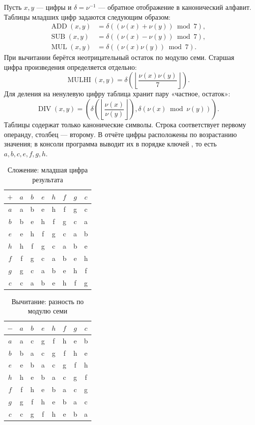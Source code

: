 \documentclass[14pt,a4paper]{extarticle}
\newcommand{\code}[1]{\texttt{\detokenize{#1}}}
\begin{document}
Пусть $x,y$ --- цифры и $\delta=\nu^{-1}$ --- обратное отображение в канонический алфавит. Таблицы младших цифр задаются следующим образом:
\[
\begin{aligned}
\operatorname{ADD}(x,y)&=\delta((\nu(x)+\nu(y))\bmod7),\\
\operatorname{SUB}(x,y)&=\delta((\nu(x)-\nu(y))\bmod7),\\
\operatorname{MUL}(x,y)&=\delta((\nu(x)\nu(y))\bmod7).
\end{aligned}
\]
При вычитании берётся неотрицательный остаток по модулю семи. Старшая цифра произведения определяется отдельно:
\[
\operatorname{MULHI}(x,y)=\delta\!\left(\left\lfloor\frac{\nu(x)\nu(y)}7\right\rfloor\right).
\]
Для деления на ненулевую цифру таблица хранит пару «частное, остаток»:
\[
\operatorname{DIV}(x,y)=
\left(\delta\!\left(\left\lfloor\frac{\nu(x)}{\nu(y)}\right\rfloor\right),
\delta(\nu(x)\bmod\nu(y))\right).
\]
Таблицы содержат только канонические символы. Строка соответствует первому операнду, столбец --- второму. В отчёте цифры расположены по возрастанию значения; в консоли программа выводит их в порядке ключей \code{std::map}, то есть $a,b,c,e,f,g,h$.

\begin{table}[H]
\caption{Сложение: младшая цифра результата}\label{tab:add}
\centering
\begin{tabular}{|c|c|c|c|c|c|c|c|}\hline
$+$ & $a$ & $b$ & $e$ & $h$ & $f$ & $g$ & $c$\\\hline
$a$ & a & b & e & h & f & g & c\\\hline
$b$ & b & e & h & f & g & c & a\\\hline
$e$ & e & h & f & g & c & a & b\\\hline
$h$ & h & f & g & c & a & b & e\\\hline
$f$ & f & g & c & a & b & e & h\\\hline
$g$ & g & c & a & b & e & h & f\\\hline
$c$ & c & a & b & e & h & f & g\\\hline
\end{tabular}
\end{table}

\begin{table}[H]
\caption{Вычитание: разность по модулю семи}\label{tab:sub}
\centering
\begin{tabular}{|c|c|c|c|c|c|c|c|}\hline
$-$ & $a$ & $b$ & $e$ & $h$ & $f$ & $g$ & $c$\\\hline
$a$ & a & c & g & f & h & e & b\\\hline
$b$ & b & a & c & g & f & h & e\\\hline
$e$ & e & b & a & c & g & f & h\\\hline
$h$ & h & e & b & a & c & g & f\\\hline
$f$ & f & h & e & b & a & c & g\\\hline
$g$ & g & f & h & e & b & a & c\\\hline
$c$ & c & g & f & h & e & b & a\\\hline
\end{tabular}
\end{table}
\end{document}
